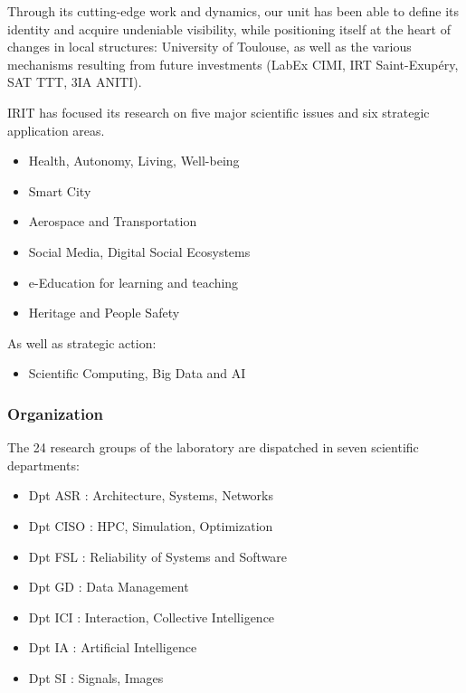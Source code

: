 \documentclass[
  a4paper, xcolor = usenames,dvipsnames]{article}
\providecommand{\tightlist}{%
  \setlength{\itemsep}{0pt}\setlength{\parskip}{0pt}}
\begin{document}
Through its cutting-edge work and dynamics, our unit has been able to define its identity and acquire undeniable visibility, while positioning itself at the heart of changes in local structures: University of Toulouse, as well as the various mechanisms resulting from future investments (LabEx CIMI, IRT Saint-Exupéry, SAT TTT, 3IA ANITI).

IRIT has focused its research on five major scientific issues and six strategic application areas.

\begin{itemize}
\tightlist
\item
  Health, Autonomy, Living, Well-being
\item
  Smart City
\item
  Aerospace and Transportation
\item
  Social Media, Digital Social Ecosystems
\item
  e-Education for learning and teaching
\item
  Heritage and People Safety
\end{itemize}

As well as strategic action:

\begin{itemize}
\tightlist
\item
  Scientific Computing, Big Data and AI
\end{itemize}

\hypertarget{organization}{%
\subsubsection{Organization}\label{organization}}

The 24 research groups of the laboratory are dispatched in seven scientific departments:

\begin{itemize}
\tightlist
\item
  Dpt ASR : Architecture, Systems, Networks
\item
  Dpt CISO : HPC, Simulation, Optimization
\item
  Dpt FSL : Reliability of Systems and Software
\item
  Dpt GD : Data Management
\item
  Dpt ICI : Interaction, Collective Intelligence
\item
  Dpt IA : Artificial Intelligence
\item
  Dpt SI : Signals, Images
\end{itemize}
\end{document}
